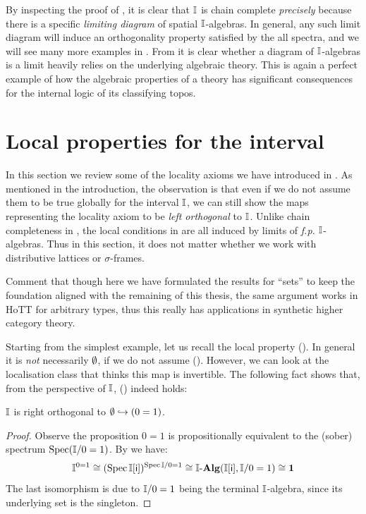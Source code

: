 \begin{remark}\label{rem:limofalgloc}
  By inspecting the proof of , it is clear that $\mathbb{I}$ is chain complete \emph{precisely} because there is a specific \emph{limiting diagram} of spatial $\mathbb{I}$-algebras. In general, any such limit diagram will induce an orthogonality property satisfied by the all spectra, and we will see many more examples in . From  it is clear whether a diagram of $\mathbb{I}$-algebras is a limit heavily relies on the underlying algebraic theory. This is again a perfect example of how the algebraic properties of a theory has significant consequences for the internal logic of its classifying topos.
\end{remark}

\section{Local properties for the interval}\label{sec:local}

In this section we review some of the locality axioms we have introduced in . As mentioned in the introduction, the observation is that even if we do not assume them to be true globally for the interval $\mathbb{I}$, we can still show the maps representing the locality axiom to be \emph{left orthogonal} to $\mathbb{I}$.  
Unlike chain completeness in , the local conditions in  are all induced by limits of \emph{f.p.} $\mathbb{I}$-algebras. Thus in this section, it does not matter whether we work with distributive lattices or $\sigma$-frames.

\begin{remark}
  Comment that though here we have formulated the results for ``sets'' to keep the foundation aligned with the remaining of this thesis, the same argument works in \gls{HoTT} for arbitrary types, thus this really has applications in synthetic higher category theory.
\end{remark}

Starting from the simplest example, let us recall the local property (\AxiomNT). In general it is \emph{not} necessarily $\emptyset$, if we do not assume (\AxiomNT). However, we can look at the localisation class that thinks this map is invertible. The following fact shows that, from the perspective of $\mathbb{I}$, (\AxiomNT) indeed holds:

\begin{proposition}[\AxiomSQCI]\label{specisnontrivial}
  $\mathbb{I}$ is right orthogonal to $\emptyset \hookrightarrow (0 = 1)$.
\end{proposition}
\begin{proof}
  Observe the proposition $0 = 1$ is propositionally equivalent to the (sober) spectrum $\operatorname{Spec}(\mathbb{I}/0=1)$. By  we have:
  \[ 
    \mathbb{I}^{0=1} \cong 
    (\operatorname{Spec} \mathbb{I}[\mathsf{i}])^{\operatorname{Spec}{\mathbb{I}/0=1}}
    \cong 
    \mathbb{I}\text{-}\mathbf{Alg}(\mathbb{I}[\mathsf{i}], \mathbb{I}/0=1) 
    \cong 
    \mathbf{1}
  \]
  The last isomorphism is due to $\mathbb{I}/0=1$ being the terminal $\mathbb{I}$-algebra, since its underlying set is the singleton.
\end{proof}

